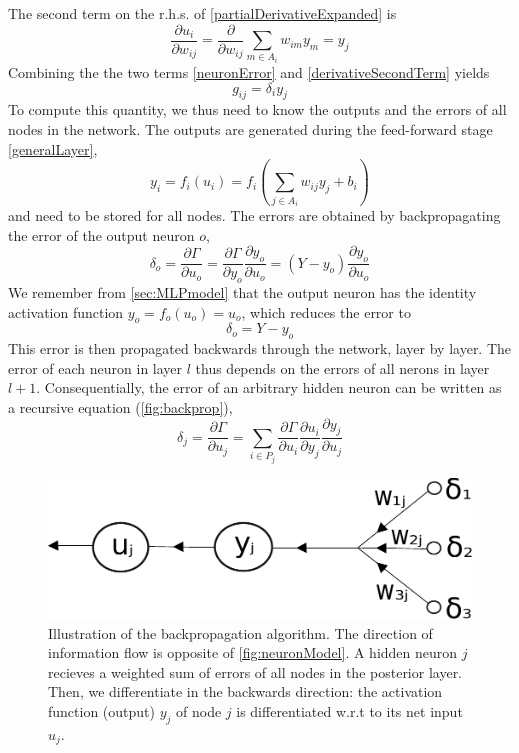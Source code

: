 \documentclass[twoside,english]{uiofysmaster}
\begin{document}
\noindent The second term on the r.h.s. of \eqref{partialDerivativeExpanded} is 
\begin{equation}
 \frac{\partial u_i}{\partial w_{ij}} = \frac{\partial}{\partial w_{ij}} \sum_{m\in A_i} w_{im}y_m = y_j
 \label{derivativeSecondTerm}
\end{equation}
Combining the the two terms \eqref{neuronError} and \eqref{derivativeSecondTerm} yields
\begin{equation}
 g_{ij} = \delta_i y_j
 \label{weightGradient}
\end{equation}
To compute this quantity, we thus need to know the outputs and the errors of all nodes in the network. 
The outputs are generated during the feed-forward stage \eqref{generalLayer},
\begin{equation}
 y_i = f_i(u_i) = f_i\left(\sum_{j\in A_i} w_{ij}y_j + b_i\right)
 \label{forwardProp}
\end{equation}
and need to be stored for all nodes. 
The errors are obtained by backpropagating the error of the output neuron $o$,
\begin{equation}
 \delta_o = \frac{\partial \Gamma}{\partial u_o} = \frac{\partial \Gamma}{\partial y_o}\frac{\partial y_o}{\partial u_o}
          = (Y - y_o) \frac{\partial y_o}{\partial u_o}
\end{equation}
We remember from \autoref{sec:MLPmodel} that the output neuron has the identity activation function $y_o = f_o(u_o) = u_o$, 
which reduces the error to
\begin{equation}
 \delta_o = Y  - y_o
\end{equation}
This error is then propagated backwards through the network, layer by layer. 
The error of each neuron in layer $l$ thus depends on the errors of all nerons in layer $l+1$.  
Consequentially, the error of an arbitrary hidden neuron can be written as a recursive equation (\autoref{fig:backprop}),
\begin{equation}
 \delta_j = \frac{\partial \Gamma}{\partial u_j} = 
 \sum_{i\in P_j} \frac{\partial \Gamma}{\partial u_i}\frac{\partial u_i}{\partial y_j}\frac{\partial y_j}{\partial u_j}
 \label{errorTerms}
\end{equation}
\begin{figure}
\begin{center}
 \includegraphics[width = 0.9\linewidth]{Figures/Theory/backprop.pdf}
  \caption{Illustration of the backpropagation algorithm. The direction of information flow is opposite of \autoref{fig:neuronModel}. 
	   A hidden neuron $j$ recieves a weighted sum of errors of all nodes in the posterior layer. Then, we differentiate
	   in the backwards direction: the activation function (output) $y_j$ of node $j$ is differentiated w.r.t to its 
	   net input $u_j$.}
  \label{fig:backprop}
  \end{center}
\end{figure}
\end{document}
